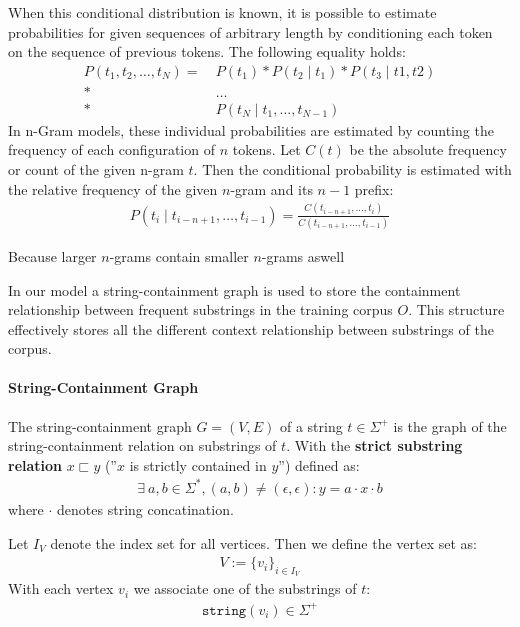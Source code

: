When this conditional distribution is known, it is possible to estimate probabilities for given sequences of arbitrary length by conditioning each token on the sequence of previous tokens. The following equality holds:
\begin{align*}
    P(t_1, t_2, \ldots, t_N) =\  &P(t_1) * P(t_2  \mid t_1) * P(t_3 \mid t1, t2)\\
                          *\  &\ldots\\
                          *\  &P(t_N \mid t_1, \ldots, t_{N-1})
\end{align*}
In n-Gram models, these individual probabilities are estimated by counting the frequency of each configuration of $n$ tokens. Let $C(t)$ be the absolute frequency or count of the given n-gram $t$. Then the conditional probability is estimated with the relative frequency of the given $n$-gram and its $n-1$ prefix:
\begin{align*}
    P(t_i \mid t_{i-n+1}, \ldots, t_{i-1}) = \frac{C(t_{i-n+1}, \ldots, t_i)}{C(t_{i-n+1}, \ldots, t_{i-1})}
\end{align*}

Because larger $n$-grams contain smaller $n$-grams aswell

\noindent In our model a string-containment graph is used to store the containment relationship between frequent substrings in the training corpus $O$. This structure effectively stores all the different context relationship between substrings of the corpus.

\paragraph*{String-Containment Graph}
The string-containment graph $G = (V, E)$ of a string $t \in \Sigma^+$ is the graph of the string-containment relation on substrings of $t$. With the \textbf{strict substring relation} $x \sqsubset y$ (''$x$ is strictly contained in $y$'') defined as:
\begin{align*}
    \exists \ a, b \in \Sigma^*, (a, b) \neq (\epsilon, \epsilon): y = a \cdot x \cdot b
\end{align*}
where $ \cdot $ denotes string concatination.

\noindent
Let $I_V$ denote the index set for all vertices. Then we define the vertex set as:
\begin{align*}
V := {\{ v_i \}}_{i \in I_V}
\end{align*}
\noindent
With each vertex $v_i$ we associate one of the substrings of $t$:
\begin{align*}
\mathtt{string}(v_i) \in \Sigma^+
\end{align*}


